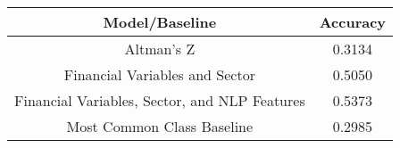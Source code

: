\footnotesize
\begin{tabular}{cc}
\toprule
Model/Baseline & Accuracy \\
\midrule
Altman's Z & 0.3134 \\
Financial Variables and Sector & 0.5050 \\
Financial Variables, Sector, and NLP Features & 0.5373 \\
Most Common Class Baseline & 0.2985 \\
\bottomrule
\end{tabular}

\normalsize